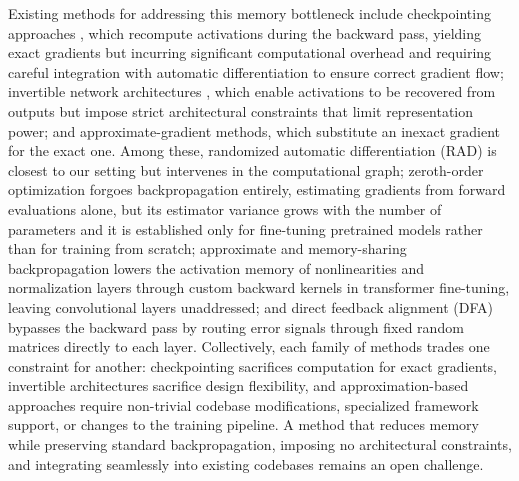\documentclass[10pt]{article}
\begin{document}
Existing methods for addressing this memory bottleneck include checkpointing approaches \citep{Griewank, chen2016training, ml-checkpoint, shah2021memory, feng2021optimal, MLSYS2023_8a27bb69, korthikanti2023reducing, 10.1145/3648633, hong2025gpu}, which recompute activations during the backward pass, yielding exact gradients but incurring significant computational overhead and requiring careful integration with automatic differentiation to ensure correct gradient flow; invertible network architectures \citep{gomez2017reversible, Haber_2017, jacobsen2018irevnet, hascoet2019reversible, ulidowski2023saving, OrozcoWitteLouboutinEtAl_2024, zhang2024memory, zhao2024dr2net}, which enable activations to be recovered from outputs but impose strict architectural constraints that limit representation power; and approximate-gradient methods, which substitute an inexact gradient for the exact one. Among these, randomized automatic differentiation (RAD) \citep{oktay2020randomized} is closest to our setting but intervenes in the computational graph; zeroth-order optimization \citep{malladi2023mezo} forgoes backpropagation entirely, estimating gradients from forward evaluations alone, but its estimator variance grows with the number of parameters and it is established only for fine-tuning pretrained models rather than for training from scratch; approximate and memory-sharing backpropagation \citep{yang2024approxbp} lowers the activation memory of nonlinearities and normalization layers through custom backward kernels in transformer fine-tuning, leaving convolutional layers unaddressed; and direct feedback alignment (DFA) \citep{DFA1, han2019efficient, wangacccnn, nokland19a, launay2020direct, frenkel, refinetti2021align, nakajima2024reservoir, yang2024direct} bypasses the backward pass by routing error signals through fixed random matrices directly to each layer. Collectively, each family of methods trades one constraint for another: checkpointing sacrifices computation for exact gradients, invertible architectures sacrifice design flexibility, and approximation-based approaches require non-trivial codebase modifications, specialized framework support, or changes to the training pipeline. A method that reduces memory while preserving standard backpropagation, imposing no architectural constraints, and integrating seamlessly into existing codebases remains an open challenge.
\end{document}
